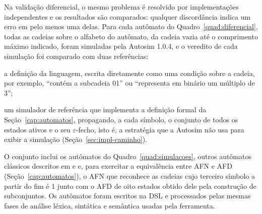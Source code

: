\documentclass[
    12pt
    ,oneside
    ,a4paper
    ,chapter=TITLE
    ,section=TITLE
    ,sumario=abnt-6027-2012]{abntex2}
\begin{document}
Na validação diferencial, o mesmo problema é resolvido por implementações independentes e
os resultados são comparados: qualquer discordância indica um erro em pelo menos uma delas.
Para cada autômato do Quadro~\ref{quad:diferencial}, todas as cadeias sobre o alfabeto do
autômato, da cadeia vazia até o comprimento máximo indicado, foram simuladas pela Autosim
1.0.4, e o veredito de cada simulação foi comparado com duas referências:

\begin{alineas}
    \item a definição da linguagem, escrita diretamente como uma condição sobre a cadeia,
    por exemplo, ``contém a subcadeia 01'' ou ``representa em binário um múltiplo de 3'';
    \item um simulador de referência que implementa a definição formal da
    Seção~\ref{cap:automatos}, propagando, a cada símbolo, o conjunto de todos os estados
    ativos e o seu $\varepsilon$-fecho, isto é, a estratégia que a Autosim não usa para exibir a
    simulação (Seção~\ref{sec:impl-caminho}).
\end{alineas}

O conjunto inclui os autômatos do Quadro~\ref{quad:simulacoes}, outros autômatos clássicos
descritos em  e  e, para exercitar a
equivalência entre AFN e AFD (Seção~\ref{cap:automatos}), o AFN que reconhece as cadeias
cujo terceiro símbolo a partir do fim é 1 \cite{sipser2012} junto com o AFD de oito estados
obtido dele pela construção de subconjuntos. Os autômatos foram escritos na DSL e
processados pelas mesmas fases de análise léxica, sintática e semântica usadas pela
ferramenta.
\end{document}
